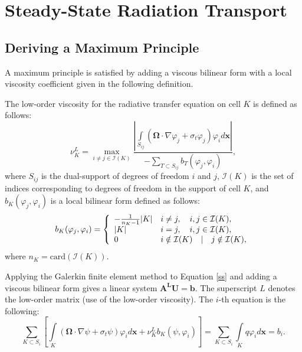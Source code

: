 \section{Steady-State Radiation Transport}
\subsection{Deriving a Maximum Principle}
A maximum principle is satisfied by adding a viscous bilinear form with a local
viscosity coefficient given in the following definition.
\begin{definition}
The low-order viscosity for the radiative transfer equation on cell $K$ is
defined as follows:
\begin{equation}
	\nu_K^L = \max\limits_{i\ne j\in \mathcal{I}(K)}\frac{\left|\int\limits_{S_{ij}}
      \left(\mathbf{\Omega}\cdot\nabla\varphi_j +
		\sigma_t\varphi_j\right)\varphi_i d\mathbf{x}\right|}
		{-\sum\limits_{T\subset S_{ij}} b_T(\varphi_j, \varphi_i)},
\end{equation}
where $S_{ij}$ is the dual-support of degrees of freedom $i$ and $j$,
$\mathcal{I}(K)$ is the set of indices corresponding to degrees of freedom in
the support of cell $K$, and $b_K(\varphi_j, \varphi_i)$ is a local bilinear
form defined as follows:
\begin{equation}
   b_K(\varphi_j, \varphi_i) = \left\{\begin{array}{l l}
      -\frac{1}{n_K - 1}|K| & i\ne j, \quad i,j\in \mathcal{I}(K),\\
      |K|                   & i = j,  \quad i,j\in \mathcal{I}(K),\\
      0                     & i\notin\mathcal{I}(K) \quad | \quad j\notin\mathcal{I}(K),
   \end{array}\right.
\end{equation}
where $n_K = \mbox{card}(\mathcal{I}(K))$.
\end{definition}

Applying the Galerkin finite element method to Equation \ref{ss} and adding a
viscous bilinear form gives a linear system $\mathbf{A^L} \mathbf{U} = \mathbf{b}$.
The superscript $L$ denotes the low-order matrix (use of the low-order viscosity). 
The $i$-th equation is the following:
\begin{equation}
	\sum\limits_{K\subset S_i}\left[\int\limits_K\left(\mathbf{\Omega}\cdot\nabla\psi
      + \sigma_t\psi\right)\varphi_i d\mathbf{x} + \nu_K^L b_K(\psi, \varphi_i)\right]
      = \sum\limits_{K\subset S_i}\int\limits_K q \varphi_i d\mathbf{x} = b_i.
\end{equation}

